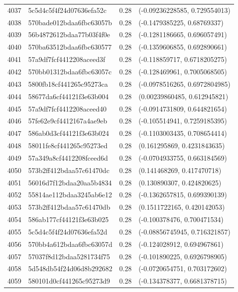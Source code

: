 \begin{table}[ht]
\begin{tabular}{rlrl}
  4037 & 5c5d4c5f4f24d07636efa52c & 0.28 & (-0.09236228585, 0.729554013) \\ 
  4038 & 570bade012bdaa6fbc63057b & 0.28 & (-0.1479385225, 0.68769337) \\ 
  4039 & 56b4872612bdaa77b03f4f0e & 0.28 & (-0.1281186665, 0.696057491) \\ 
  4040 & 570ba63512bdaa6fbc630577 & 0.28 & (-0.1359606855, 0.692890661) \\ 
  4041 & 57a9df7fcf4412208aceed3f & 0.28 & (-0.118859717, 0.6718205275) \\ 
  4042 & 570bb01312bdaa6fbc63057c & 0.28 & (-0.128469961, 0.7005068505) \\ 
  4043 & 5800fb18cf441265c95273ca & 0.28 & (-0.0978516265, 0.6972804985) \\ 
  4044 & 58677da6cf44121f3e63b004 & 0.28 & (0.00239860485, 0.612945821) \\ 
  4045 & 57a9df7fcf4412208aceed40 & 0.28 & (-0.0914731809, 0.644821654) \\ 
  4046 & 57fe62e9cf4412167a4ae9eb & 0.28 & (-0.105514941, 0.7259185395) \\ 
  4047 & 586ab0d3cf44121f3e63b024 & 0.28 & (-0.1103003435, 0.708654414) \\ 
  4048 & 58011fe8cf441265c95273ed & 0.28 & (0.161295869, 0.4231843635) \\ 
  4049 & 57a349a8cf4412208fceed6d & 0.28 & (-0.0704933755, 0.663184569) \\ 
  4050 & 573b2ff412bdaa57c61470dc & 0.28 & (0.141468269, 0.417470718) \\ 
  4051 & 56016d7f12bdaa20aa5b4834 & 0.28 & (0.130890307, 0.424820625) \\ 
  4052 & 55814ae112bdaa3245ab6e12 & 0.28 & (-0.1362657815, 0.699390139) \\ 
  4053 & 573b2ff412bdaa57c61470db & 0.28 & (0.1511722165, 0.420142053) \\ 
  4054 & 586ab177cf44121f3e63b025 & 0.28 & (-0.100378476, 0.700471534) \\ 
  4055 & 5c5d4c5f4f24d07636efa52d & 0.28 & (-0.08856745945, 0.716321857) \\ 
  4056 & 570bb4a612bdaa6fbc63057d & 0.28 & (-0.124028912, 0.694967861) \\ 
  4057 & 57037f8d12bdaa5281734f75 & 0.28 & (-0.101890225, 0.6926798905) \\ 
  4058 & 5d548db54f24d06d8b292682 & 0.28 & (-0.0720654751, 0.703172602) \\ 
  4059 & 580101d0cf441265c95273d9 & 0.28 & (-0.134378377, 0.6681378715) \\ 

\end{tabular}
\end{table}
